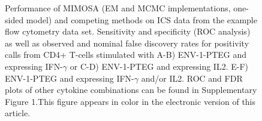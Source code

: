 \documentclass[12pt,oupdraft]{biostatistics}
\begin{document}
\begin{figure}
   \caption{Performance of MIMOSA (EM and MCMC implementations, one-sided model) and competing methods on ICS data from the example flow cytometry data set. Sensitivity and specificity (ROC analysis) as well as observed and nominal false discovery rates for positivity calls from CD4+ T-cells stimulated with A-B) ENV-1-PTEG and expressing IFN-$\gamma$ or C-D) ENV-1-PTEG and expressing IL2. E-F) ENV-1-PTEG and expressing IFN-$\gamma$ and/or IL2. ROC and FDR plots of other cytokine combinations can be found in Supplementary Figure 1.This figure appears in color in the electronic version of this article.}
\label{fig:HVTN065}
\end{figure}
\end{document}
